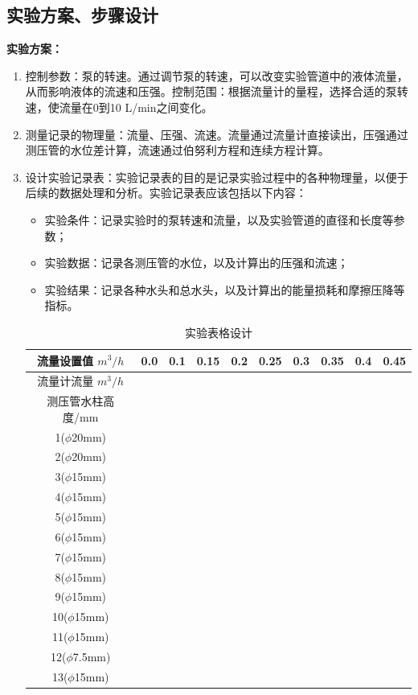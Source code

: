 \documentclass[dvipsnames, svgnames,a4paper,11pt]{article}
\begin{document}
	
	\subsection{实验方案、步骤设计}
	\textbf{实验方案：}
	
	\begin{enumerate}
		\item 控制参数：泵的转速。通过调节泵的转速，可以改变实验管道中的液体流量，从而影响液体的流速和压强。控制范围：根据流量计的量程，选择合适的泵转速，使流量在0到10 L/min之间变化。
		\item 测量记录的物理量：流量、压强、流速。流量通过流量计直接读出，压强通过测压管的水位差计算，流速通过伯努利方程和连续方程计算。
		\item 设计实验记录表：实验记录表的目的是记录实验过程中的各种物理量，以便于后续的数据处理和分析。实验记录表应该包括以下内容：
		
		\begin{itemize}
			\item 实验条件：记录实验时的泵转速和流量，以及实验管道的直径和长度等参数；
			\item 实验数据：记录各测压管的水位，以及计算出的压强和流速；
			\item 实验结果：记录各种水头和总水头，以及计算出的能量损耗和摩擦压降等指标。
		\end{itemize}
		
		\begin{table}[h]
			\centering
			\caption{实验表格设计}
			\begin{tabular}{|c|c|c|c|c|c|c|c|c|c|}
				\hline
				流量设置值 $m^3/h$ & 0.0 & 0.1 & 0.15 & 0.2 & 0.25 & 0.3 & 0.35 & 0.4 & 0.45 \\
				\hline
				流量计流量 $m^3/h$ & & & & & & & & & \\
				\hline
				测压管水柱高度/mm & & & & & & & & & \\
				\hline
				1($\phi$20mm) & & & & & & & & & \\
				\hline
				2($\phi$20mm) & & & & & & & & & \\
				\hline
				3($\phi$15mm) & & & & & & & & & \\
				\hline
				4($\phi$15mm) & & & & & & & & & \\
				\hline
				5($\phi$15mm) & & & & & & & & & \\
				\hline
				6($\phi$15mm) & & & & & & & & & \\
				\hline
				7($\phi$15mm) & & & & & & & & & \\
				\hline
				8($\phi$15mm) & & & & & & & & & \\
				\hline
				9($\phi$15mm) & & & & & & & & & \\
				\hline
				10($\phi$15mm) & & & & & & & & & \\
				\hline
				11($\phi$15mm) & & & & & & & & & \\
				\hline
				12($\phi$7.5mm) & & & & & & & & & \\
				\hline
				13($\phi$15mm) & & & & & & & & & \\
				\hline
			\end{tabular}
		\end{table}
		
	\end{enumerate}
	
\end{document}
